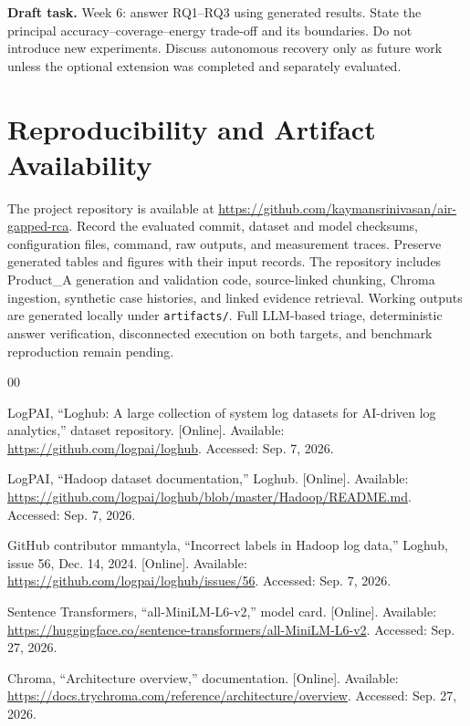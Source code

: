 \documentclass[conference]{IEEEtran}
\newcommand{\draftnote}[1]{%
\par\smallskip\noindent
\colorbox{pale}{%
\parbox{\dimexpr\columnwidth-2\fboxsep\relax}{%
\small\textbf{Draft task.} #1}}%
\par\smallskip}
\begin{document}
\draftnote{
Week 6: answer RQ1--RQ3 using generated results.
State the principal accuracy--coverage--energy trade-off
and its boundaries. Do not introduce new experiments.
Discuss autonomous recovery only as future work unless
the optional extension was completed and separately evaluated.
}

\section*{Reproducibility and Artifact Availability}

The project repository is available at
\url{https://github.com/kaymansrinivasan/air-gapped-rca}.
Record the evaluated commit, dataset and model checksums,
configuration files, command, raw outputs, and measurement traces.
Preserve generated tables and figures with their input records.
The repository includes Product\_A generation and validation code,
source-linked chunking, Chroma ingestion, synthetic case histories,
and linked evidence retrieval. Working outputs are generated
locally under \texttt{artifacts/}. Full LLM-based triage,
deterministic answer verification, disconnected execution on
both targets, and benchmark reproduction remain pending.

\begin{thebibliography}{00}

LogPAI,
``Loghub: A large collection of system log datasets
for AI-driven log analytics,''
dataset repository.
[Online]. Available:
\url{https://github.com/logpai/loghub}.
Accessed: Sep. 7, 2026.

LogPAI,
``Hadoop dataset documentation,''
Loghub.
[Online]. Available:
\url{https://github.com/logpai/loghub/blob/master/Hadoop/README.md}.
Accessed: Sep. 7, 2026.

GitHub contributor mmantyla,
``Incorrect labels in Hadoop log data,''
Loghub, issue 56, Dec. 14, 2024.
[Online]. Available:
\url{https://github.com/logpai/loghub/issues/56}.
Accessed: Sep. 7, 2026.

Sentence Transformers,
``all-MiniLM-L6-v2,''
model card.
[Online]. Available:
\url{https://huggingface.co/sentence-transformers/all-MiniLM-L6-v2}.
Accessed: Sep. 27, 2026.

Chroma,
``Architecture overview,''
documentation.
[Online]. Available:
\url{https://docs.trychroma.com/reference/architecture/overview}.
Accessed: Sep. 27, 2026.

\end{thebibliography}

\end{document}
